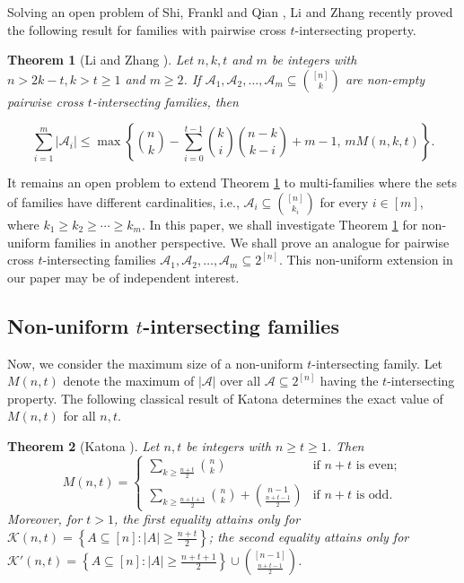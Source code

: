\documentclass[11pt,a4paper]{article}
\newtheorem{theorem}{Theorem}[section]
\begin{document}
 
 Solving an open problem of Shi, Frankl and Qian \cite[Problem 4.4]{S22}, 
 Li and Zhang  \cite{L25} recently proved the following result for  families with pairwise cross $t$-intersecting property.  


 

\begin{theorem}[Li and Zhang \cite{L25}]\label{L25}
Let $ n, k, t$ and $ m $ be  integers with $ n > 2k - t,  k > t \geq  1$ and $ m \geq  2 $. If $ \mathcal{A}_1, \mathcal{A}_2, \ldots, \mathcal{A}_m \subseteq \binom{[n]}{k} $ are non-empty pairwise cross $t$-intersecting families, then

$$
\sum_{i=1}^m |\mathcal{A}_i| \leq \max \left\{ \binom{n}{k} - \sum_{i=0} ^{t-1}\binom{k}{i} \binom{n-k}{k-i} + m - 1, \, m M(n, k, t) \right\}. 
$$
\end{theorem}

It remains an open problem \cite[Problem 4.5]{S22} to extend Theorem \ref{L25} to multi-families where the sets of families have different cardinalities, i.e., 
$\mathcal{A}_i \subseteq {[n] \choose k_i}$ for every $i\in [m]$, where $k_1\geq k_2\geq \cdots \geq k_m$.  
In this paper, we shall investigate Theorem \ref{L25} for  non-uniform families in another perspective. We shall prove an analogue for pairwise cross $t$-intersecting families $\mathcal{A}_1, \mathcal{A}_2,\ldots ,\mathcal{A}_m\subseteq 2^{[n]}$. This non-uniform extension in our paper may be of independent interest.



\subsection{Non-uniform $t$-intersecting families}

Now, we consider the maximum size of a non-uniform $t$-intersecting family. 
Let $M(n, t)$ denote the maximum of $|\mathcal{A}|$ over all $\mathcal{A}\subseteq 2^{[n]}$ having the $t$-intersecting property.
The following classical result of Katona \cite{K64} determines the exact value of 
 $M(n, t)$ for all $n, t$. 

\begin{theorem}[Katona \cite{K64}] \label{K64}
Let $n, t$ be integers with $n \geq  t\geq  1$.  Then
$$
M(n, t)= \begin{cases} 
\sum_{k\geq \frac{n+t}{2}} {n \choose k} & 
\text{if $n+t$ is even}; \\ 
\sum_{k\geq \frac{n+t+1}{2}} {n \choose k} + {n-1 \choose \frac{n+t-1}{2}} & \text {if $n+t$ is odd}.\end{cases}
$$ 
Moreover, for $t>1$, the first equality attains only for $ \mathcal{K}(n,t) =\left\{A \subseteq [n]:|A| \geq  \frac{n+t}{2}\right\}$; the second equality attains only for $\mathcal{K}'(n,t)=\left\{A \subseteq [n]:|A| \geq  \frac{n+t+1}{2}\right\}\cup {[n-1] \choose \frac{n+t-1}{2}}$.
\end{theorem} 
\end{document}
